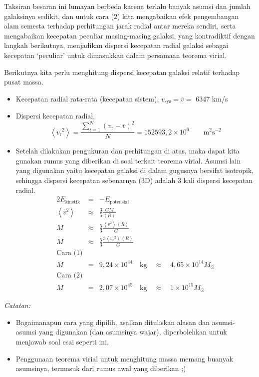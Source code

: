 \documentclass[11pt,fleqn]{exam}
\newcommand*{\Msun}{\ensuremath{M_{\odot}}}
\begin{document}
\begin{questions}
\begin{enumerate}[a.]
	
	Taksiran besaran ini lumayan berbeda karena terlalu banyak asumsi dan jumlah galaksinya sedikit, dan untuk cara (2) kita mengabaikan efek pengembangan alam semesta terhadap perhitungan jarak radial antar mereka sendiri, serta mengabaikan kecepatan peculiar masing-masing galaksi, yang kontradiktif dengan langkah berikutnya, menjadikan dispersi kecepatan radial galaksi sebagai kecepatan `peculiar' untuk dimasukkan dalam persamaan teorema virial.

	
	Berikutnya kita perlu menghitung dispersi kecepatan galaksi relatif terhadap pusat massa.
	\begin{itemize}
		\item Kecepatan radial rata-rata (kecepatan sistem), $v_\text{sys} = \overline{v} = $ 6347 km/s 
		\item Dispersi kecepatan radial, 
		$$ \left< {v_\text{r}}^2 \right> = \frac{\sum_{i=1}^{N} \left( v_\text{r} - \overline{v} \right)^2}{N} = 152593,2 \times 10^{6} \qquad \text{m}^2\text{s}^{-2}$$
		\item Setelah dilakukan pengukuran dan perhitungan di atas, maka dapat kita gunakan rumus yang diberikan di soal terkait teorema virial. Asumsi lain yang digunakan yaitu kecepatan galaksi di dalam gugusnya bersifat isotropik, sehingga dispersi kecepatan sebenarnya (3D) adalah 3 kali dispersi kecepatan radial.
		\begin{eqnarray*}
			2 E_\text{kinetik} &=& - E_\text{potensial}\\
			\left< v^2 \right> &\approx& \frac{3}{5}\frac{GM}{\left< R \right>}\\
			M &\approx& \frac{5}{3} \frac{\left< v^2 \right> \left< R \right>}{G}\\
			M &\approx& \frac{5}{3}  \frac{ 3 \left<{v_{r}}^2 \right> \left< R \right>}{G}\\
			\text{Cara (1)} & & \\
			M &=& 9,24 \times 10^{44} \quad \text{kg} \quad \approx \quad  4,65 \times 10^{14} \Msun\\
			\text{Cara (2)} & & \\
			M &=& 2,07 \times 10^{45} \quad \text{kg} \quad \approx \quad  1 \times 10^{15} \Msun
		\end{eqnarray*}
	\end{itemize}
	
	
	\textit{Catatan:}
	\begin{itemize}
		\item Bagaimanapun cara yang dipilih, asalkan dituliskan alasan dan asumsi-asumsi yang digunakan (dan asumsinya wajar), diperbolehkan untuk menjawab soal esai seperti ini.
		\item Penggunaan teorema virial untuk menghitung massa memang buanyak asumsinya, termasuk dari rumus awal yang diberikan ;) 
	\end{itemize}
	

\end{enumerate}
\end{questions}
\end{document}
